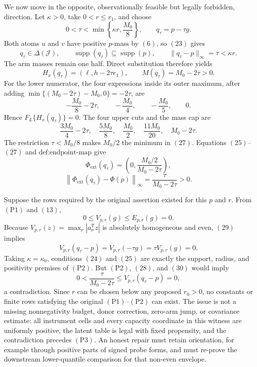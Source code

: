 We now move in the opposite, observationally feasible but legally forbidden, direction.  Let \(\kappa>0\), take \(0<r\le r_1\), and choose
\[
 0<\tau<\min\left\{\kappa r,\frac{M_0}{8}\right\},
 \qquad q_\tau=p-\tau g.
\tag{23}
\]
Both atoms \(u\) and \(v\) have positive \(p\)-mass by \((6)\), so \((23)\) gives
\[
 q_\tau\in\Delta(\mathcal J),\qquad
 \operatorname{supp}(q_\tau)\subseteq\operatorname{supp}(p),
 \qquad \lVert q_\tau-p\rVert_\infty=\tau<\kappa r.
\tag{24}
\]
The arm masses remain one half.  Direct substitution therefore yields
\[
 H_x(q_\tau)=\left(\ell,h-2\tau e_1\right),
 \qquad M(q_\tau)=M_0-2\tau>0.
\tag{25}
\]
For the lower numerator, the four expressions inside its outer maximum, after adding \(\min\{(M_0-2\tau)-M_0,0\}=-2\tau\), are
\[
 -\frac{M_0}{8}-2\tau,\qquad
 -\frac{M_0}{4},\qquad
 -\frac{M_0}{5},\qquad 0.
\tag{26}
\]
Hence \(F_L\{H_x(q_\tau)\}=0\).  The four upper cuts and the mass cap are
\[
 \frac{3M_0}{4}-2\tau,\quad
 \frac{5M_0}{8},\quad
 \frac{M_0}{2},\quad
 \frac{11M_0}{20},\quad
 M_0-2\tau.
\tag{27}
\]
The restriction \(\tau<M_0/8\) makes \(M_0/2\) the minimum in \((27)\).  Equations \((25)\)--\((27)\) and \(\text{def:endpoint-map}\) give
\[
 \Phi_{\mathrm{ext}}(q_\tau)
 =\left(0,\frac{M_0/2}{M_0-2\tau}\right),
\]
\[
 \left\lVert\Phi_{\mathrm{ext}}(q_\tau)-\Phi(p)\right\rVert_\infty
 =\frac{\tau}{M_0-2\tau}>0.
\tag{28}
\]

Suppose the rows required by the original assertion existed for this \(p\) and \(r\).  From \((\mathrm{P1})\) and \((13)\),
\[
 0\le V_{p,r}(g)\le E_{p,r}(g)=0.
\tag{29}
\]
Because \(V_{p,r}(z)=\max_\nu|a_\nu^{\mathsf T}z|\) is absolutely homogeneous and even, \((29)\) implies
\[
 V_{p,r}(q_\tau-p)=V_{p,r}(-\tau g)=\tau V_{p,r}(g)=0.
\tag{30}
\]
Taking \(\kappa=\kappa_0\), conditions \((24)\) and \((25)\) are exactly the support, radius, and positivity premises of \((\mathrm{P2})\).  But \((\mathrm{P2})\), \((28)\), and \((30)\) would imply
\[
 0<\frac{\tau}{M_0-2\tau}
 \le V_{p,r}(q_\tau-p)=0,
\]
a contradiction.  Since \(r\) can be chosen below any proposed \(r_0>0\), no constants or finite rows satisfying the original \((\mathrm{P1})\)--\((\mathrm{P2})\) can exist.  The issue is not a missing nonnegativity budget, donor correction, zero-arm jump, or covariance estimate: all instrument cells and every capacity coordinate in this witness are uniformly positive, the latent table is legal with fixed propensity, and the contradiction precedes \((\mathrm{P3})\).  An honest repair must retain orientation, for example through positive parts of signed probe forms, and must re-prove the downstream lower-quantile comparison for that non-even envelope.
